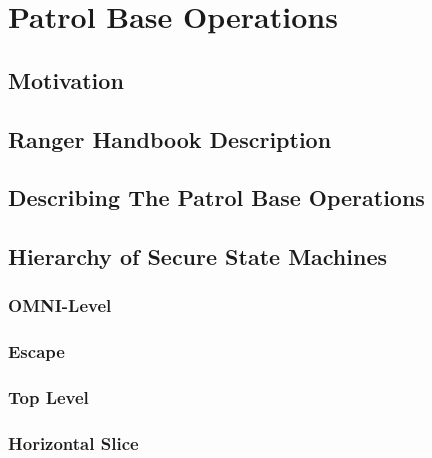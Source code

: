 \documentclass[../../main/main.tex]{subfiles}
\begin{document}
\chapter{Patrol Base Operations}
\section{Motivation}

\section{Ranger Handbook Description}

\section{Describing The Patrol Base Operations}

\section{Hierarchy of Secure State Machines}

\subsection{OMNI-Level}

\subsection{Escape}

\subsection{Top Level}

\subsection{Horizontal Slice}
\end{document}

